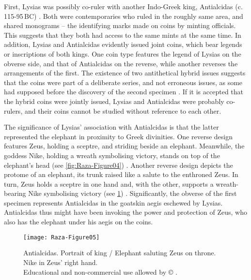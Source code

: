 \documentclass{ijsra}
\renewcommand\BC{{\,BC\xspace}}
\def\coinindia{Educational and non-commercial use allowed by © \cite{Coin}.}
\begin{document}
First, Lysias was possibly co-ruler with another Indo-Greek king, Antialcidas (c. 115-95\BC) \parencite[121]{Mairs2014}.
Both were contemporaries who ruled in the roughly same area, and shared monograms – the identifying marks made on coins by minting officials.
This suggests that they both had access to the same mints at the same time.
In addition, Lysias and Antialcidas evidently issued joint coins, which bear legends or inscriptions of both kings.
One coin type features the legend of Lysias on the obverse side, and that of Antialcidas on the reverse, while another reverses the arrangements of the first.
The existence of two antithetical hybrid issues suggests that the coins were part of a deliberate series, and not erroneous issues, as some had supposed before the discovery of the second specimen \parencites[1184]{Bopearachchi2015}[154]{Narain2003}.
If it is accepted that the hybrid coins were jointly issued, Lysias and Antialcidas were probably co-rulers, and their coins cannot be studied without reference to each other.

The significance of Lysias’ association with Antialcidas is that the latter represented the elephant in proximity to Greek divinities.
One reverse design features Zeus, holding a sceptre, and striding beside an elephant. Meanwhile, the goddess Nike, holding a wreath symbolising victory, stands on top of the elephant’s head (see \cref{fig:Raza-Figure04}) \parencite[27]{Narain1991}.
Another reverse design depicts the protome of an elephant, its trunk raised like a salute to the enthroned Zeus.
In turn, Zeus holds a sceptre in one hand and, with the other, supports a wreath-bearing Nike symbolising victory (see \cref{fig:Raza-Figure05}) \parencite[33--34]{Whitehead1970}.
Significantly, the obverse of the first specimen represents Antialcidas in the goatskin aegis eschewed by Lysias.
Antialcidas thus might have been invoking the power and protection of Zeus, who also has the elephant under his aegis on the coins. 

\begin{figure}[!htb] %
	\centering
	\texttt{[image: Raza-Figure05]}
	\caption{Antialcidas. Portrait of king / Elephant saluting Zeus on throne. Nike in Zeus’ right hand.
		{\normalfont\scriptsize \\ \coinindia}}
	\label{fig:Raza-Figure05}
\end{figure}
\end{document}
